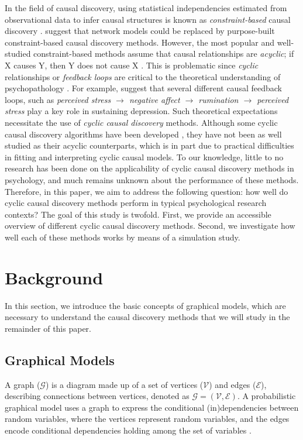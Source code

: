 \documentclass[twoside, 11pt]{article}
\begin{document}
In the field of causal discovery, using statistical independencies estimated from observational data to infer causal structures is known as \textit{constraint-based} causal discovery \citep{spirtes_algorithm_1991}. \cite{Ryan2022} suggest that network models could be replaced by purpose-built constraint-based causal discovery methods. However, the most popular and well-studied constraint-based methods assume that causal relationships are \textit{acyclic}; if X causes Y, then Y does not cause X \citep{Glymour2019}. This is problematic since \textit{cyclic} relationships or \textit{feedback loops} are critical to the theoretical understanding of psychopathology \citep{borsboom_network_2017}. For example, \cite{wittenborn_2016} suggest that several different causal feedback loops, such as \textit{perceived stress $\rightarrow$ negative affect $\rightarrow$ rumination $\rightarrow$ perceived stress} play a key role in sustaining depression. Such theoretical expectations necessitate the use of \textit{cyclic causal discovery} methods. Although some cyclic causal discovery algorithms have been developed \citep{mooij_classen2020}, they have not been as well studied as their acyclic counterparts, which is in part due to practical difficulties in fitting and interpreting cyclic causal models. To our knowledge, little to no research has been done on the applicability of cyclic causal discovery methods in psychology, and much remains unknown about the performance of these methods.
Therefore, in this paper, we aim to address the following question: how well do
cyclic causal discovery methods perform in typical psychological research contexts? The goal of this study is twofold. First, we provide an accessible overview of different cyclic causal discovery methods. Second, we investigate how well each of these methods works by means of a simulation study.  



\section{Background}
In this section, we introduce the basic concepts of graphical models, which are necessary to understand the causal discovery methods that we will study in the remainder of this paper. 

\subsection{Graphical Models} 
A graph ($\mathcal{G}$) is a diagram made up of a set of vertices ($\mathcal{V}$) and edges ($\mathcal{E}$), describing connections between vertices, denoted as $\mathcal{G} = (\mathcal{V},  \mathcal{E})$.
A probabilistic graphical model uses a graph to express the conditional (in)dependencies between random variables, where the vertices represent random variables, and the edges encode conditional dependencies holding among the set of variables \citep{lauritzen1996graphical}. 
\end{document}

